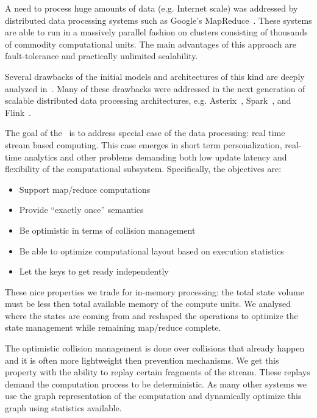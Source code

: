 
\label {fs-intro-seciton}

A need to process huge amounts of data (e.g. Internet scale) was addressed by distributed data processing systems such as Google's MapReduce~\cite{Dean:2008:MSD:1327452.1327492}. These systems are able to run in a massively parallel fashion on clusters consisting of thousands of commodity computational units. The main advantages of this approach are fault-tolerance and practically unlimited scalability.

Several drawbacks of the initial models and architectures of this kind are deeply analyzed in~\cite{Doulkeridis:2014:SLA:2628707.2628782}. Many of these drawbacks were addressed in the next generation of scalable distributed data processing architectures, e.g. Asterix~\cite{Alsubaiee:2012:ASW:2331801.2331803}, Spark~\cite{Zaharia:2016:ASU:3013530.2934664,Franklin:2015:MSB:2684822.2685326}, 
and Flink~\cite{Carbone:2017:SMA:3137765.3137777}. 

The goal of the \FlameStream\ is to address special case of the data processing: real time stream based computing. This case emerges in short term personalization, real-time analytics and other problems demanding both low update latency and flexibility of the computational subsystem. Specifically, the objectives are:

\begin {itemize}
\item Support map/reduce computations
\item Provide ``exactly once'' semantics
\item Be optimistic in terms of collision management
\item Be able to optimize computational layout based on execution statistics
\item Let the keys to get ready independently
\end {itemize}

These nice properties we trade for in-memory processing: the total state volume must be less then total available memory of the compute units. We analysed where the states are coming from and reshaped the operations to optimize the state management while remaining map/reduce complete. 

The optimistic collision management is done over collisions that already happen and it is often more lightweight then prevention mechanisms. We get this property with the ability to replay certain fragments of the stream. These replays demand the computation process to be deterministic. As many other systems we use the graph representation of the computation and dynamically optimize this graph using statistics available. 

